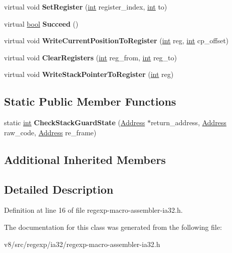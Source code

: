 \begin{DoxyCompactItemize}
virtual void {\bfseries Set\+Register} (\mbox{\hyperlink{classint}{int}} register\+\_\+index, \mbox{\hyperlink{classint}{int}} to)
\item 
\mbox{\label{classv8_1_1internal_1_1RegExpMacroAssemblerIA32_a9b9f04a2468a95654fcf47cc1138e126}} 
virtual \mbox{\hyperlink{classbool}{bool}} {\bfseries Succeed} ()
\item 
\mbox{\label{classv8_1_1internal_1_1RegExpMacroAssemblerIA32_abbc5bf6f018f59a42e35d9dc043d43d3}} 
virtual void {\bfseries Write\+Current\+Position\+To\+Register} (\mbox{\hyperlink{classint}{int}} reg, \mbox{\hyperlink{classint}{int}} cp\+\_\+offset)
\item 
\mbox{\label{classv8_1_1internal_1_1RegExpMacroAssemblerIA32_aa166f443e627743bed233f025faf5151}} 
virtual void {\bfseries Clear\+Registers} (\mbox{\hyperlink{classint}{int}} reg\+\_\+from, \mbox{\hyperlink{classint}{int}} reg\+\_\+to)
\item 
\mbox{\label{classv8_1_1internal_1_1RegExpMacroAssemblerIA32_af72711a532acfce762ca951f20013a8a}} 
virtual void {\bfseries Write\+Stack\+Pointer\+To\+Register} (\mbox{\hyperlink{classint}{int}} reg)
\end{DoxyCompactItemize}
\subsection*{Static Public Member Functions}
\begin{DoxyCompactItemize}
\item 
\mbox{\label{classv8_1_1internal_1_1RegExpMacroAssemblerIA32_ab2de96e2a67a91358b6005082c2238fd}} 
static \mbox{\hyperlink{classint}{int}} {\bfseries Check\+Stack\+Guard\+State} (\mbox{\hyperlink{classuintptr__t}{Address}} $\ast$return\+\_\+address, \mbox{\hyperlink{classuintptr__t}{Address}} raw\+\_\+code, \mbox{\hyperlink{classuintptr__t}{Address}} re\+\_\+frame)
\end{DoxyCompactItemize}
\subsection*{Additional Inherited Members}


\subsection{Detailed Description}


Definition at line 16 of file regexp-\/macro-\/assembler-\/ia32.\+h.



The documentation for this class was generated from the following file\+:\begin{DoxyCompactItemize}
\item 
v8/src/regexp/ia32/regexp-\/macro-\/assembler-\/ia32.\+h\end{DoxyCompactItemize}
